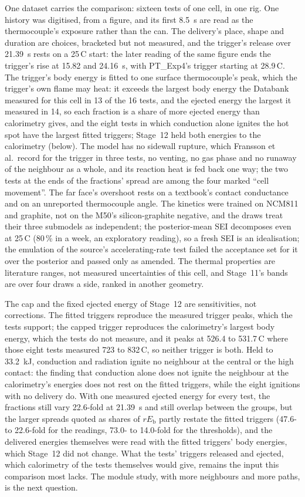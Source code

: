 \documentclass[preprint,12pt]{elsarticle}
\newcommand{\degC}{\,\textdegree C}
\newcommand{\Eb}{E_{\mathrm{b}}}
\begin{document}
One dataset carries the comparison: sixteen tests of one cell, in one rig. One history was digitised, from a figure, and its first 8.5~s are read as the thermocouple's exposure rather than the can. The delivery's place, shape and duration are choices, bracketed but not measured, and the trigger's release over 21.39~s rests on a 25\degC{} start: the later reading of the same figure ends the trigger's rise at 15.82 and 24.16~s, with PT\_Exp4's trigger starting at 28.9\degC. The trigger's body energy is fitted to one surface thermocouple's peak, which the trigger's own flame may heat: it exceeds the largest body energy the Databank measured for this cell in 13 of the 16 tests, and the ejected energy the largest it measured in 14, so each fraction is a share of more ejected energy than calorimetry gives, and the eight tests in which conduction alone ignites the hot spot have the largest fitted triggers; Stage~12 held both energies to the calorimetry (below). The model has no sidewall rupture, which Fransson et al.\ record for the trigger in three tests, no venting, no gas phase and no runaway of the neighbour as a whole, and its reaction heat is fed back one way; the two tests at the ends of the fractions' spread are among the four marked ``cell movement''. The far face's overshoot rests on a textbook's contact conductance and on an unreported thermocouple angle. The kinetics were trained on NCM811 and graphite, not on the M50's silicon-graphite negative, and the draws treat their three submodels as independent; the posterior-mean SEI decomposes even at 25\degC{} (80\,\% in a week, an exploratory reading), so a fresh SEI is an idealisation; the emulation of the source's accelerating-rate test failed the acceptance set for it over the posterior and passed only as amended. The thermal properties are literature ranges, not measured uncertainties of this cell, and Stage~11's bands are over four draws a side, ranked in another geometry.

The cap and the fixed ejected energy of Stage~12 are sensitivities, not corrections. The fitted triggers reproduce the measured trigger peaks, which the tests support; the capped trigger reproduces the calorimetry's largest body energy, which the tests do not measure, and it peaks at 526.4 to 531.7\degC{} where those eight tests measured 723 to 832\degC, so neither trigger is both. Held to 33.2~kJ, conduction and radiation ignite no neighbour at the central or the high contact: the finding that conduction alone does not ignite the neighbour at the calorimetry's energies does not rest on the fitted triggers, while the eight ignitions with no delivery do. With one measured ejected energy for every test, the fractions still vary 22.6-fold at 21.39~s and still overlap between the groups, but the larger spreads quoted as shares of $r\Eb$ partly restate the fitted triggers (47.6- to 22.6-fold for the readings, 73.0- to 14.0-fold for the thresholds), and the delivered energies themselves were read with the fitted triggers' body energies, which Stage~12 did not change. What the tests' triggers released and ejected, which calorimetry of the tests themselves would give, remains the input this comparison most lacks. The module study, with more neighbours and more paths, is the next question.
\end{document}
